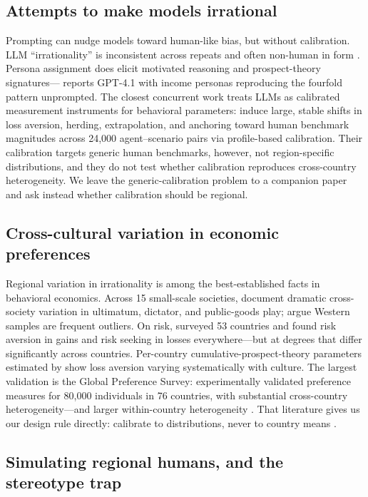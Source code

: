 \documentclass[10pt,letterpaper]{article}
\begin{document}
\subsection{Attempts to make models irrational}

Prompting can nudge models toward human-like bias, but without calibration.
LLM ``irrationality'' is inconsistent across repeats and often non-human in
form \citep{macmillan-scott2024}. Persona assignment does elicit motivated
reasoning \citep{dash2025} and prospect-theory signatures---\citet{dubedy2026}
reports GPT-4.1 with income personas reproducing the fourfold pattern
unprompted. The closest concurrent work treats LLMs as calibrated
measurement instruments for behavioral parameters: \citet{yee2026} induce
large, stable shifts in loss aversion, herding, extrapolation, and anchoring
toward human benchmark magnitudes across 24,000 agent--scenario pairs via
profile-based calibration. Their calibration targets generic human
benchmarks, however, not region-specific distributions, and they do not test
whether calibration reproduces cross-country heterogeneity. We leave the
generic-calibration problem to a companion paper and ask instead whether
calibration should be regional.

\subsection{Cross-cultural variation in economic preferences}

Regional variation in irrationality is among the best-established facts in
behavioral economics. Across 15 small-scale societies, \citet{henrich2001}
document dramatic cross-society variation in ultimatum, dictator, and
public-goods play; \citet{henrich2010} argue Western samples are frequent
outliers. On risk, \citet{rieger2015} surveyed 53 countries and found risk
aversion in gains and risk seeking in losses everywhere---but at degrees
that differ significantly across countries. Per-country
cumulative-prospect-theory parameters estimated by \citet{wang2017} show
loss aversion varying systematically with culture. The largest validation is
the Global Preference Survey: experimentally validated preference measures
for 80,000 individuals in 76 countries, with substantial cross-country
heterogeneity---and larger within-country heterogeneity \citep{falk2018}.
That literature gives us our design rule directly: calibrate to
distributions, never to country means \citep{falk2018}.

\subsection{Simulating regional humans, and the stereotype trap}
\end{document}
